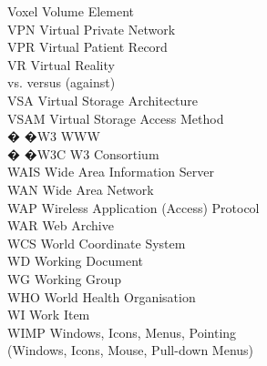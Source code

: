 \begin{tabbing}

    \>Voxel \>\>Volume Element\\

    \>VPN \>\>Virtual Private Network\\

    \>VPR \>\>Virtual Patient Record\\

    \>VR \>\>Virtual Reality\\


    \>vs. \>\>versus (against)\\

    \>VSA \>\>Virtual Storage Architecture\\

    \>VSAM \>\>Virtual Storage Access Method\\


 � �\>W3 \>\>WWW\\

 � �\>W3C \>\>W3 Consortium\\

    \>WAIS \>\>Wide Area Information Server\\

    \>WAN \>\>Wide Area Network\\

    \>WAP \>\>Wireless Application (Access) Protocol\\

    \>WAR \>\>Web Archive\\

    \>WCS \>\>World Coordinate System\\

    \>WD \>\>Working Document\\

    \>WG \>\>Working Group\\

    \>WHO \>\>World Health Organisation\\


    \>WI \>\>Work Item\\

    \>WIMP \>\>Windows, Icons, Menus, Pointing\\
        \>\>\>(Windows, Icons, Mouse, Pull-down Menus)\\


\end{tabbing}
